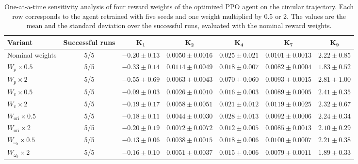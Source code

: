 \documentclass{ieeeaccess}
\begin{document}
\begin{table}[t]
    \centering
    \caption{One-at-a-time sensitivity analysis of four reward weights of the optimized PPO agent on the
    circular trajectory. Each row corresponds to the agent retrained with five seeds and one weight multiplied
    by 0.5 or 2. The values are the mean and the standard deviation over the successful runs, evaluated with
    the nominal reward weights.}
    \label{tab:reward_sensitivity}
    \renewcommand{\arraystretch}{1.05}
    \setlength{\tabcolsep}{6pt}
    \small
    \begin{tabular}{lcccccc}
        \toprule
        \textbf{Variant} & \textbf{Successful runs} & $\boldsymbol{K_1}$ & $\boldsymbol{K_2}$ &
          $\boldsymbol{K_4}$ & $\boldsymbol{K_7}$ & $\boldsymbol{K_9}$ \\
        \midrule
        Nominal weights & 5/5 & $-0.20 \pm 0.13$ & $0.0050 \pm 0.0016$ & $0.025 \pm 0.021$ &
          $0.0101 \pm 0.0013$ & $2.22 \pm 0.85$ \\
        $W_p \times 0.5$ & 5/5 & $-0.33 \pm 0.14$ & $0.0114 \pm 0.0049$ & $0.018 \pm 0.007$ &
          $0.0082 \pm 0.0004$ & $1.83 \pm 0.52$ \\
        $W_p \times 2$ & 5/5 & $-0.55 \pm 0.69$ & $0.0063 \pm 0.0043$ & $0.070 \pm 0.060$ &
          $0.0093 \pm 0.0015$ & $2.81 \pm 1.00$ \\
        $W_v \times 0.5$ & 5/5 & $-0.09 \pm 0.03$ & $0.0026 \pm 0.0010$ & $0.016 \pm 0.003$ &
          $0.0089 \pm 0.0005$ & $2.41 \pm 0.35$ \\
        $W_v \times 2$ & 5/5 & $-0.19 \pm 0.17$ & $0.0058 \pm 0.0051$ & $0.021 \pm 0.012$ &
          $0.0119 \pm 0.0025$ & $2.32 \pm 0.67$ \\
        $W_{\mathrm{ori}} \times 0.5$ & 5/5 & $-0.18 \pm 0.11$ & $0.0044 \pm 0.0030$ & $0.028 \pm 0.013$ &
          $0.0092 \pm 0.0006$ & $2.24 \pm 0.34$ \\
        $W_{\mathrm{ori}} \times 2$ & 5/5 & $-0.20 \pm 0.19$ & $0.0072 \pm 0.0072$ & $0.012 \pm 0.005$ &
          $0.0085 \pm 0.0013$ & $2.10 \pm 0.29$ \\
        $W_{\omega_b} \times 0.5$ & 5/5 & $-0.13 \pm 0.06$ & $0.0038 \pm 0.0015$ & $0.018 \pm 0.006$ &
          $0.0100 \pm 0.0007$ & $2.21 \pm 0.38$ \\
        $W_{\omega_b} \times 2$ & 5/5 & $-0.16 \pm 0.10$ & $0.0051 \pm 0.0037$ & $0.015 \pm 0.006$ &
          $0.0079 \pm 0.0011$ & $1.89 \pm 0.33$ \\
        \bottomrule
    \end{tabular}
\end{table}
\end{document}
